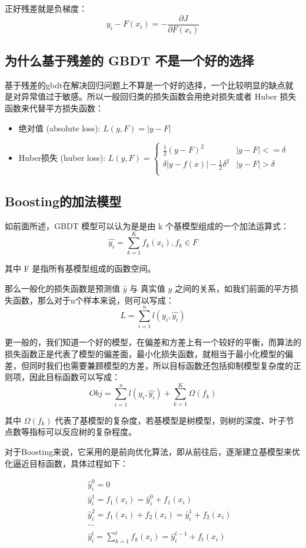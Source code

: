\documentclass[12pt]{article}
\begin{document}
正好残差就是负梯度：
$$
y_i-F(x_i) = -\frac{\partial J}{\partial F(x_i)} 
$$

\subsection{为什么基于残差的 GBDT 不是一个好的选择}

基于残差的gbdt在解决回归问题上不算是一个好的选择，一个比较明显的缺点就是对异常值过于敏感。所以一般回归类的损失函数会用绝对损失或者 Huber 损失函数来代替平方损失函数：

\begin{itemize}[itemindent=2em]
    \item 绝对值 (absolute loss): 
    $L(y,F) = |y-F|$
    
    \item Huber损失 (huber loss): 
    $L(y,F) = \begin{cases}
\frac{1}{2}(y-F)^2 & |y-F| <= \delta\\
\delta|y-f(x)|-\frac{1}{2}\delta^2 & |y-F| > \delta\\
\end{cases}$
\end{itemize}

\subsection{Boosting的加法模型}
如前面所述，GBDT 模型可以认为是是由 k 个基模型组成的一个加法运算式：
$$
\hat{y_i} = \sum_{k=1}^K{f_k(x_i)}, f_k \in F
$$

其中 F 是指所有基模型组成的函数空间。

那么一般化的损失函数是预测值 $\hat{y}$ 与 真实值 $y$ 之间的关系，如我们前面的平方损失函数，那么对于n个样本来说，则可以写成：
$$
L = \sum_{i=1}^n{l(y_i,\hat{y_i})}
$$

更一般的，我们知道一个好的模型，在偏差和方差上有一个较好的平衡，而算法的损失函数正是代表了模型的偏差面，最小化损失函数，就相当于最小化模型的偏差，但同时我们也需要兼顾模型的方差，所以目标函数还包括抑制模型复杂度的正则项，因此目标函数可以写成：
$$
Obj = \sum_{i=1}^n{l(y_i,\hat{y_i})} + \sum_{k=1}^{K}\Omega(f_k)
$$

其中 $\Omega(f_k)$ 代表了基模型的复杂度，若基模型是树模型，则树的深度、叶子节点数等指标可以反应树的复杂程度。

对于Boosting来说，它采用的是前向优化算法，即从前往后，逐渐建立基模型来优化逼近目标函数，具体过程如下：

\begin{eqnarray*}
 && \hat{y}_i^0 = 0 \\
 && \hat{y}_i^1 = f_1(x_i)= \hat{y}_i^0 + f_1(x_i)\\
 && \hat{y}_i^2 = f_1(x_i) + f_2(x_i) = \hat{y}_i^1 + f_2(x_i) \\
 && \cdots \\
 && \hat{y}_i^t = \sum_{k=1}^tf_k(x_i) = \hat{y}_i^{t-1} + f_t(x_i)
\end{eqnarray*}
\end{document}
